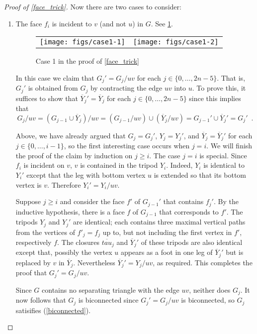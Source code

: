 \documentclass{patmorin}
\begin{document}
\begin{proof}[Proof of \cref{face_trick}]
  Now there are two cases to consider:

  \begin{enumerate}
    \item The face $f_i$ is incident to $v$ (and not $u$) in $G$. See \cref{replacement}.
    \begin{figure}
      \begin{center}
        \begin{tabular}{cc}
          \texttt{[image: figs/case1-1]} & \texttt{[image: figs/case1-2]}
        \end{tabular}
      \end{center}
      \caption{Case 1 in the proof of \cref{face_trick}}
      \label{replacement}
    \end{figure}

    In this case we claim that $G_j'=G_j/uv$ for each $j\in\{0,\ldots,2n-5\}$. That is, $G_j'$ is obtained from $G_j$ by contracting the edge $uv$ into $u$.  To prove this, it suffices to show that $\overline{Y}_j'=\overline{Y}_j$ for each $j\in\{0,\ldots,2n-5\}$ since this implies that
    \[
      G_j/uv = (G_{j-1}\cup\overline{Y}_j)/uv=(G_{j-1}/uv) \cup (\overline{Y}_j/uv) = G_{j-1}'\cup \overline{Y}_j' = G_j' \enspace .
    \]

    Above, we have already argued that $G_j=G_j'$, $Y_j=Y_j'$, and $\overline{Y}_j=\overline{Y}_j'$ for each $j\in\{0,\ldots,i-1\}$, so the first interesting case occurs when $j=i$.  We will finish the proof of the claim by induction on $j\ge i$. The case $j=i$ is special.  Since $f_i$ is incident on $v$, $v$ is contained in the tripod $Y_i$.  Indeed, $Y_i$ is identical to $Y_i'$ except that the leg with bottom vertex $u$ is extended so that its bottom vertex is $v$. Therefore $Y_i'=Y_i/uv$.

    Suppose $j\ge i$ and consider the face $f'$ of $G_{j-1}'$ that contains $f_j'$.  By the inductive hypothesis, there is a face $f$ of $G_{j-1}$ that corresponds to $f'$. The tripods $Y_j$ and $Y_j'$ are identical; each contains three maximal vertical paths from the vertices of $f'_j=f_j$ up to, but not including the first vertex in $f'$, respectively $f$.  The closures $\overline{tau}_j$ and $\overline{Y}_j'$ of these tripods are also identical except that, possibly the vertex $u$ appears as a foot in one leg of $\overline{Y}_j'$ but is replaced by $v$ in $\overline{Y}_j$.  Nevertheless $\overline{Y}_j'=Y_j/uv$, as required.  This completes the proof that $G_j'=G_j/uv$.

    Since $G$ contains no separating triangle with the edge $uv$, neither does $G_j$.  It now follows that $G_j$ is biconnected since $G_j'=G_j/uv$ is biconnected, so $G_j$ satisifies (\ref{biconnected}).


\end{enumerate}
\end{proof}
\end{document}
